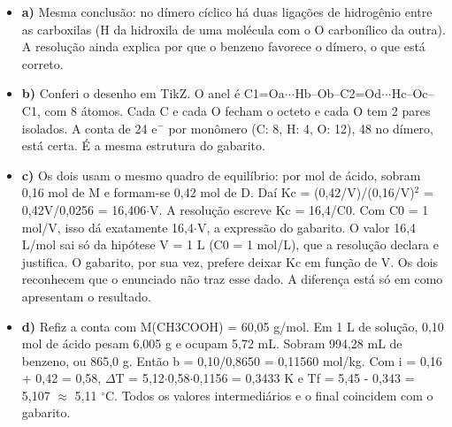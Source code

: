 \documentclass{article}%
\begin{document}
\begin{itemize}%
\item%
\textbf{a)} Mesma conclusão: no dímero cíclico há duas ligações de hidrogênio entre as carboxilas (H da hidroxila de uma molécula com o O carbonílico da outra). A resolução ainda explica por que o benzeno favorece o dímero, o que está correto.%
\item%
\textbf{b)} Conferi o desenho em TikZ. O anel é C1=Oa$\cdot$$\cdot$$\cdot$Hb--Ob--C2=Od$\cdot$$\cdot$$\cdot$Hc--Oc--C1, com 8 átomos. Cada C e cada O fecham o octeto e cada O tem 2 pares isolados. A conta de 24 e$^{-}$ por monômero (C: 8, H: 4, O: 12), 48 no dímero, está certa. É a mesma estrutura do gabarito.%
\item%
\textbf{c)} Os dois usam o mesmo quadro de equilíbrio: por mol de ácido, sobram 0,16 mol de M e formam{-}se 0,42 mol de D. Daí Kc = (0,42/V)/(0,16/V)$^2$ = 0,42V/0,0256 = 16,406$\cdot$V. A resolução escreve Kc = 16,4/C0. Com C0 = 1 mol/V, isso dá exatamente 16,4$\cdot$V, a expressão do gabarito. O valor 16,4 L/mol sai só da hipótese V = 1 L (C0 = 1 mol/L), que a resolução declara e justifica. O gabarito, por sua vez, prefere deixar Kc em função de V. Os dois reconhecem que o enunciado não traz esse dado. A diferença está só em como apresentam o resultado.%
\item%
\textbf{d)} Refiz a conta com M(CH3COOH) = 60,05 g/mol. Em 1 L de solução, 0,10 mol de ácido pesam 6,005 g e ocupam 5,72 mL. Sobram 994,28 mL de benzeno, ou 865,0 g. Então b = 0,10/0,8650 = 0,11560 mol/kg. Com i = 0,16 + 0,42 = 0,58, $\Delta$T = 5,12$\cdot$0,58$\cdot$0,1156 = 0,3433 K e Tf = 5,45 - 0,343 = 5,107 $\approx$ 5,11 $^\circ$C. Todos os valores intermediários e o final coincidem com o gabarito.%
\end{itemize}%
\end{document}
